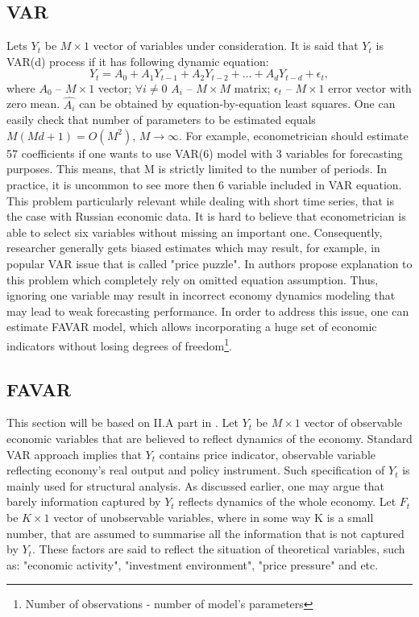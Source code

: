 \documentclass[a4paper, 14pt]{article}
\begin{document}
\subsection{VAR}
Lets $Y_t$ be $M\times 1$ vector of variables under consideration. It is said that $Y_t$ is VAR(d) process if it has following dynamic equation:
\begin{equation}
	Y_t = A_0 + A_1 Y_{t-1} + A_2 Y_{t-2} + \dotso + A_d Y_{t-d} + \epsilon_t,
\end{equation}
where $A_0$ -- $M\times1$ vector; $\forall i\neq0$ $A_i$  -- $M\times M$ matrix; $\epsilon_t$ -- $M\times 1$ error vector with zero mean. $\hat{A_i}$ can be obtained by equation-by-equation least squares. One can easily check that number of parameters to be estimated equals $M(M d + 1) = O(M^2)$, $M \rightarrow \infty$. For example, econometrician should estimate 57 coefficients if one wants to use VAR(6) model with 3 variables for forecasting purposes. This means, that M is strictly limited to the number of periods. In practice, it is uncommon to see more then 6 variable included in VAR equation. This problem particularly relevant while dealing with short time series, that is the case with Russian economic data. It is hard to believe that econometrician is able to select six variables without missing an important one. Consequently, researcher generally gets biased estimates which may result, for example, in popular VAR issue that is called "price puzzle". In \cite{bernanke2005measuring} authors propose explanation to this problem which completely rely on omitted equation assumption. Thus, ignoring one variable may result in incorrect economy dynamics modeling that may lead to weak forecasting performance. In order to address this issue, one can estimate FAVAR model, which allows incorporating a huge set of economic indicators without losing degrees of freedom\footnote{Number of observations - number of model's parameters}.

\subsection{FAVAR}
This section will be based on II.A part in \cite{bernanke2005measuring}. Let $Y_t$ be $M \times 1$ vector of observable economic variables that are believed to reflect dynamics of the economy. Standard VAR approach implies that $Y_t$ contains price indicator, observable variable reflecting economy's real output and policy instrument. Such specification of $Y_t$ is mainly used for structural analysis. As discussed earlier, one may argue that barely information captured by $Y_t$ reflects dynamics of the whole economy. Let $F_t$ be $K \times 1$ vector of unobservable variables, where in some way K is a small number, that are assumed to summarise all the information that is not captured by $Y_t$. These factors are said to reflect the situation of theoretical variables, such as: "economic activity", "investment environment", "price pressure" and etc. 
\end{document}
